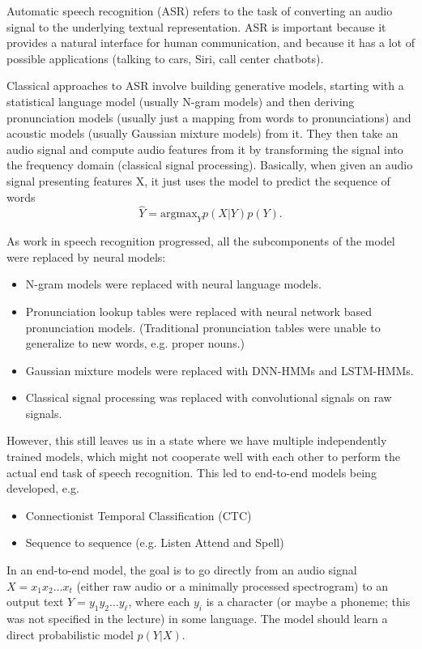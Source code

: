 Automatic speech recognition (ASR) refers to the task of converting an audio signal to the underlying textual representation. ASR is important because it provides a natural interface for human communication, and because it has a lot of possible applications (talking to cars, Siri, call center chatbots).

Classical approaches to ASR involve building generative models, starting with a statistical language model (usually N-gram models) and then deriving pronunciation models (usually just a mapping from words to pronunciations) and acoustic models (usually Gaussian mixture models) from it. They then take an audio signal and compute audio features from it by transforming the signal into the frequency domain (classical signal processing). Basically, when given an audio signal presenting features X, it just uses the model to predict the sequence of words
$$\hat{Y} = \text{argmax}_Y p(X | Y) p(Y).$$

As work in speech recognition progressed, all the subcomponents of the model were replaced by neural models:
\begin{itemize}
\item N-gram models were replaced with neural language models.
\item Pronunciation lookup tables were replaced with neural network based pronunciation models. (Traditional pronunciation tables were unable to generalize to new words, e.g. proper nouns.)
\item Gaussian mixture models were replaced with DNN-HMMs and LSTM-HMMs.
\item Classical signal processing was replaced with convolutional signals on raw signals.
\end{itemize}

However, this still leaves us in a state where we have multiple independently trained models, which might not cooperate well with each other to perform the actual end task of speech recognition. This led to end-to-end models being developed, e.g.
\begin{itemize}
\item Connectionist Temporal Classification (CTC)
\item Sequence to sequence (e.g. Listen Attend and Spell)
\end{itemize}

In an end-to-end model, the goal is to go directly from an audio signal $X = x_1x_2\dots x_t$ (either raw audio or a minimally processed spectrogram) to an output text $Y = y_1y_2\dots y_{\ell}$, where each $y_i$ is a character (or maybe a phoneme; this was not specified in the lecture) in some language. The model should learn a direct probabilistic model $p(Y|X)$.

